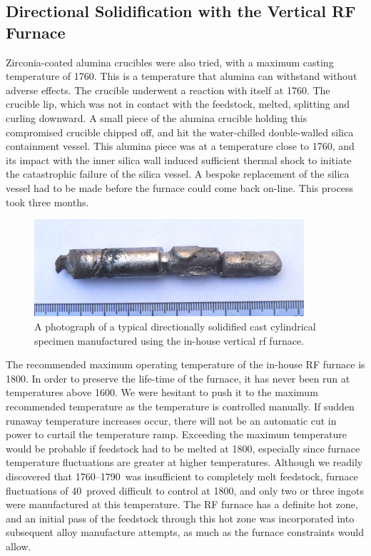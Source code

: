 \subsection{Directional Solidification with the Vertical RF Furnace}

Zirconia-coated alumina crucibles were also tried, with a maximum casting temperature of 1760\celsius.  This is a temperature that alumina can withstand without adverse effects.  The crucible underwent a reaction with itself at 1760\celsius.  The crucible lip, which was not in contact with the feedstock, melted, splitting and curling downward.  A small piece of the alumina crucible holding this compromised crucible chipped off, and hit the water-chilled double-walled silica containment vessel.  This alumina piece was at a temperature close to 1760\celsius, and its impact with the inner silica wall induced sufficient thermal shock to initiate the catastrophic failure of the silica vessel.  A bespoke replacement of the silica vessel had to be made before the furnace could come back on-line.  This process took three months.

%
\begin{figure}[H]
\begin{center}
\includegraphics[width=10cm]{rfi}
\caption{A photograph of a typical directionally solidified cast cylindrical specimen manufactured using the in-house vertical rf furnace.}
\label{fig:rfia}
\end{center}
\end{figure}
%

The recommended maximum operating temperature of the in-house RF furnace is 1800\celsius.  In order to preserve the life-time of the furnace, it has never been run at temperatures above 1600\celsius.  We were hesitant to push it to the maximum recommended temperature as the temperature is controlled manually.  If sudden runaway temperature increases occur, there will not be an automatic cut in power to curtail the temperature ramp. Exceeding the maximum temperature would be probable if feedstock had to be melted at 1800\celsius, especially since furnace temperature fluctuations are greater at higher temperatures.  Although we readily discovered that 1760--1790\celsius\ was insufficient to completely melt feedstock, furnace fluctuations of 40\celsius\ proved difficult to control at 1800\celsius, and only two or three ingots were manufactured at this temperature.  The RF furnace has a definite hot zone, and an initial pass of the feedstock through this hot zone was incorporated into subsequent alloy manufacture attempts, as much as the furnace constraints would allow.  

